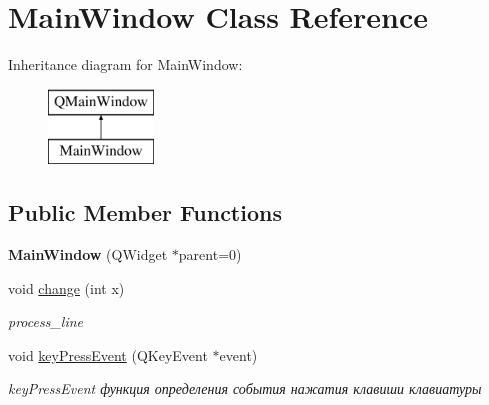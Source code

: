 \hypertarget{class_main_window}{}\section{Main\+Window Class Reference}
\label{class_main_window}
Inheritance diagram for Main\+Window\+:\begin{figure}[H]
\begin{center}
\leavevmode
\includegraphics[height=2.000000cm]{class_main_window}
\end{center}
\end{figure}
\subsection*{Public Member Functions}
\begin{DoxyCompactItemize}
\item 
\mbox{\label{class_main_window_a8b244be8b7b7db1b08de2a2acb9409db}} 
{\bfseries Main\+Window} (Q\+Widget $\ast$parent=0)
\item 
void \mbox{\hyperlink{class_main_window_af978c1fc634b73b34ffc2dd64e187c53}{change}} (int x)
\begin{DoxyCompactList}\small\item\em process\+\_\+line \end{DoxyCompactList}\item 
void \mbox{\hyperlink{class_main_window_a9c4f542263838b9ecd06eae839a42a34}{key\+Press\+Event}} (Q\+Key\+Event $\ast$event)
\begin{DoxyCompactList}\small\item\em key\+Press\+Event функция определения события нажатия клавиши клавиатуры \end{DoxyCompactList}\end{DoxyCompactItemize}
